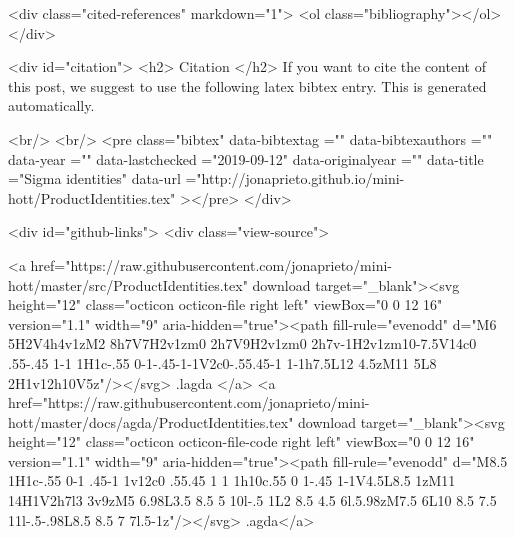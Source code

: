   <div class="cited-references" markdown="1">
  <ol class="bibliography"></ol>
  </div>


  
  <div id="citation">
  <h2> Citation </h2>
  If you want to cite the content of this post,
  we suggest to use the following latex bibtex entry.
  This is generated automatically.

  <br/>
  <br/>
  <pre class="bibtex"
       data-bibtextag =""
       data-bibtexauthors =""
       data-year =""
       data-lastchecked ="2019-09-12"
       data-originalyear =""
       data-title ="Sigma identities"
       data-url ="http://jonaprieto.github.io/mini-hott/ProductIdentities.tex"
  ></pre>
  </div>
  

  <div id="github-links">
    <div class="view-source">
      
        <a href="https://raw.githubusercontent.com/jonaprieto/mini-hott/master/src/ProductIdentities.tex" download target="_blank"><svg height="12" class="octicon octicon-file right left" viewBox="0 0 12 16" version="1.1" width="9" aria-hidden="true"><path fill-rule="evenodd" d="M6 5H2V4h4v1zM2 8h7V7H2v1zm0 2h7V9H2v1zm0 2h7v-1H2v1zm10-7.5V14c0 .55-.45 1-1 1H1c-.55 0-1-.45-1-1V2c0-.55.45-1 1-1h7.5L12 4.5zM11 5L8 2H1v12h10V5z"/></svg> .lagda </a>
        <a href="https://raw.githubusercontent.com/jonaprieto/mini-hott/master/docs/agda/ProductIdentities.tex" download target="_blank"><svg height="12" class="octicon octicon-file-code right left" viewBox="0 0 12 16" version="1.1" width="9" aria-hidden="true"><path fill-rule="evenodd" d="M8.5 1H1c-.55 0-1 .45-1 1v12c0 .55.45 1 1 1h10c.55 0 1-.45 1-1V4.5L8.5 1zM11 14H1V2h7l3 3v9zM5 6.98L3.5 8.5 5 10l-.5 1L2 8.5 4.5 6l.5.98zM7.5 6L10 8.5 7.5 11l-.5-.98L8.5 8.5 7 7l.5-1z"/></svg> .agda</a>
      
